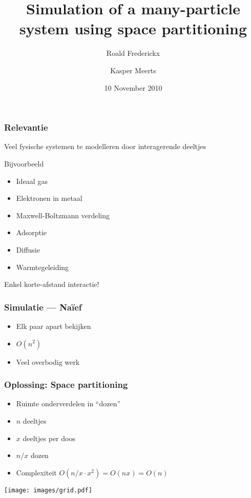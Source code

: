 \documentclass{beamer}
\title{Simulation of a many-particle system using space partitioning}
\author{Roald Frederickx \and Kasper Meerts}
\date{10 November 2010}
\newcommand{\figscale}[2]{
	\begin{center}
	\scalebox{#1}{
		
	}
	\end{center}
}
\begin{document}
\begin{frame}
\titlepage
\end{frame}

\begin{frame}
\tableofcontents
\end{frame}

\begin{frame}
\frametitle{Relevantie}
Veel fysische systemen te modelleren door interagerende deeltjes

Bijvoorbeeld
\begin{itemize}
\item Ideaal gas
\item Elektronen in metaal
\item Maxwell-Boltzmann verdeling
\item Adsorptie
\item Diffusie
\item Warmtegeleiding
\end{itemize}

Enkel korte-afstand interactie!
\end{frame}

\begin{frame}
\frametitle{Simulatie --- Na\"ief}
\begin{itemize}
\item Elk paar apart bekijken
\item $O(n^2)$
\item Veel overbodig werk
\end{itemize}
\figscale{0.6}{quadraticComplexity}
\end{frame}

\begin{frame}
\frametitle{Oplossing: Space partitioning}
\begin{itemize}
\item Ruimte onderverdelen in ``dozen''
\item $n$ deeltjes
\item $x$ deeltjes per doos
\item $n/x$ dozen
\item Complexiteit $O(n/x \cdot x^2) = O(nx) = O(n)$
\end{itemize}
\begin{center}
\texttt{[image: images/grid.pdf]}
\end{center}
\end{frame}
\end{document}
